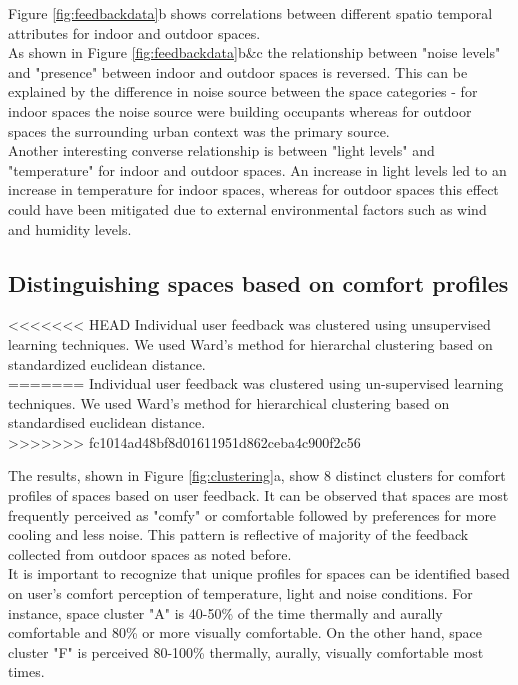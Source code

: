 Figure \ref{fig:feedbackdata}b shows correlations between different spatio temporal attributes for indoor and outdoor spaces.\\

As shown in Figure \ref{fig:feedbackdata}b\&c the relationship between "noise levels" and "presence" between indoor and outdoor spaces is reversed. This can be explained by the difference in noise source between the space categories - for indoor spaces the noise source were building occupants whereas for outdoor spaces the surrounding urban context was the primary source.\\

Another interesting converse relationship is between "light levels" and "temperature" for indoor and outdoor spaces. An increase in light levels led to an increase in temperature for indoor spaces, whereas for outdoor spaces this effect could have been mitigated due to external environmental factors such as wind and humidity levels.\\



\subsection{Distinguishing spaces based on comfort profiles}
\label{ch:userResults}

<<<<<<< HEAD
Individual user feedback was clustered using unsupervised learning techniques. We used Ward's method for hierarchal clustering based on standardized euclidean distance.\\
=======
Individual user feedback was clustered using un-supervised learning techniques. We used Ward's method for hierarchical clustering based on standardised euclidean distance.\\
>>>>>>> fc1014ad48bf8d01611951d862ceba4c900f2c56

The results, shown in Figure \ref{fig:clustering}a, show 8 distinct clusters for comfort profiles of spaces based on user feedback. It can be observed that spaces are most frequently perceived as "comfy" or comfortable followed by preferences for more cooling and less noise. This pattern is reflective of majority of the feedback collected from outdoor spaces as noted before.\\

It is important to recognize that unique profiles for spaces can be identified based on user's comfort perception of temperature, light and noise conditions. For instance, space cluster "A" is 40-50\% of the time thermally and aurally comfortable and 80\% or more visually comfortable. On the other hand, space cluster "F" is perceived 80-100\% thermally, aurally, visually comfortable most times.\\           


